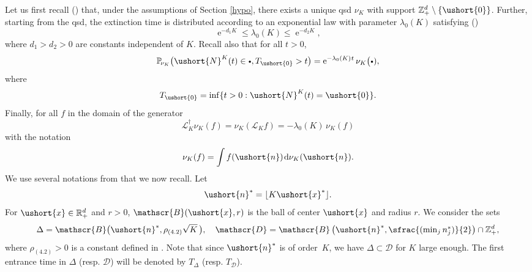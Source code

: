 \documentclass[JEP,XML,SOM,Unicode]{cedram}
\newcommand{\psfrac}[2]{\sfrac{(#1)}{#2}}
\newcommand{\sbullet}{{\scriptscriptstyle\bullet}}
\newcommand{\csbullet}{{\raisebox{1pt}{$\sbullet$}}}
\let\backslash\setminus
\let\ts\textstyle
\let\mathcal\mathscr
\numberwithin{equation}{section}
\theoremstyle{plain}
\theoremstyle{definition}
\newcommand{\proba}{{\mathbb{P}}}
\newcommand{\zentiers}{{\mathbb{Z}}}
\newcommand{\domaine}{\zentiers_{+}^{d}}
\newcommand{\rpd}{\mathbb{R}_+^d}
\newcommand{\sK}{K}
\newcommand{\gen}{\mathscr{L}_{\sK}}
\newcommand{\vecn}{\ushort{n}}
\newcommand{\vecnf}{\ushort{n}^*}
\newcommand{\vecxf}{\ushort{x}^*}
\newcommand{\vecx}{\ushort{x}}
\newcommand{\veczer}{\ushort{0}}
\newcommand{\sDelta}{\Delta}
\newcommand{\leproc}{\ushort{N}^{K}}
\newcommand{\nuk}{\nu_{K}}\let\snuk\nuk
\newcommand{\e}{\operatorname{e}}
\newcommand{\dd}{\hspace{1pt}\mathrm{d}}
\begin{document}
Let us first recall (\cf \cite{ccm2}) that, under the assumptions of Section \ref{hypo}, there exists a unique qsd $
\nuk$ with support $\domaine\backslash \{\veczer\}$.
Further, starting from the qsd, the extinction time is distributed according to an exponential law with parameter
$\lambda_{0}(K)$ satisfying (\cite[Th.\,3.2]{ccm2})
\begin{equation}
\label{eq:lambda0}
\e^{-d_{1} K}\le\lambda_{0}(K)\le \e^{-d_{2} K},
\end{equation}
where $d_{1}>d_{2}>0$ are constants independent of $K$.
Recall also that for all $t>0$,
\begin{equation}
\label{pte-qsd}
\proba_{\!\nuk}\bigl(\leproc(t)\in \csbullet,T_{\veczer}>t\bigr)=
\e^{-\lambda_{0}(K)\hspace{.4pt}t}\nuk\bigl(\csbullet),
\end{equation}
where
\[
T_{\veczer}=\inf\{t>0: \leproc(t)=\veczer\}.
\]
Finally, for all $f$ in the domain of the generator
\begin{equation}
\label{eq:miracle}
\gen^{\dagger}\nuk(f)=\nuk(\gen f)= - \lambda_{0}(K)\,\nuk(f)
\end{equation}
with the notation
\[
\nuk(f)=\int f(\vecn) \dd\nuk(\vecn).
\]
We use several notations from \cite{ccm2} that we now recall. Let
\[
\vecnf= \lfloor K \vecxf\rfloor.
\]
For $\vecx\in\rpd$ and $r>0$, $\mathcal{B}(\vecx,r)$ is the ball of center $\vecx$ and radius $r$.
We consider the sets
\begin{equation}
\label{boule}
\Delta = \mathcal{B}\bigl(\vecn^*,\rho_{(4.2)}\sqrt{K}\,\bigr), \quad\mathcal{D} = \mathcal{B} \left(\vecnf,\psfrac{\ts\min_{j} n_{j}^*}{2}\right)\cap \domaine,
\end{equation}
where $\rho_{(4.2)}>0$ is a constant defined in \cite[Cor.\,4.2]{ccm2}.
Note that since $\vecnf$ is of order~$K$, we have
$\Delta \subset \mathcal{D}$ for $K$ large enough. The first entrance time in $\Delta$ (resp. $
\mathcal{D}$) will be denoted by $T_{\!\sDelta}$ (resp. $T_\mathcal{D}$).
\end{document}
